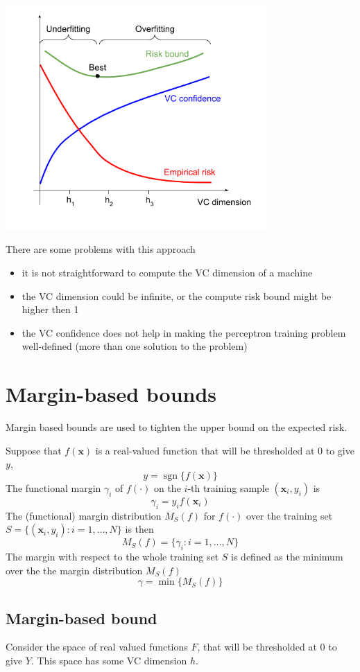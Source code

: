 \documentclass[oneside,onecolumn]{report}
\DeclareMathOperator*{\sgn}{sgn}
\begin{document}
\begin{center}
    \includegraphics[width=10cm]{structural_risk_minimzation.png}
\end{center}

There are some problems with this approach
\begin{itemize}
    \item it is not straightforward to compute the VC dimension of a machine
    \item the VC dimension could be infinite, or the compute risk bound might be higher then 1
    \item the VC confidence does not help in making the perceptron training problem well-defined (more than one solution to the problem)
\end{itemize}


\section{Margin-based bounds}
Margin based bounds are used to tighten the upper bound on the expected risk.

Suppose that $f(\bm x)$ is a real-valued function that will be thresholded at 0 to give $y$,
$$ y = \sgn\{f(\bm x)\} $$
The functional margin $\gamma_i$ of $f(\cdot)$ on the $i$-th training sample $(\bm x_i, y_i)$ is
$$ \gamma_i = y_i f(\bm x_i) $$
The (functional) margin distribution $M_S(f)$ for $f(\cdot)$ over the training set $S = \{ (\bm x_i, y_i) : i = 1, \dots, N \}$ is then
$$ M_S(f) = \{ \gamma_i : i = 1, \dots, N \} $$
The margin with respect to the whole training set $S$ is defined as the minimum over the the margin distribution $M_S(f)$
$$ \gamma = \min\{ M_S(f) \} $$

\subsection{Margin-based bound}
Consider the space of real valued functions $F$, that will be thresholded at 0 to give $Y$.
This space has some VC dimension $h$.
\end{document}
